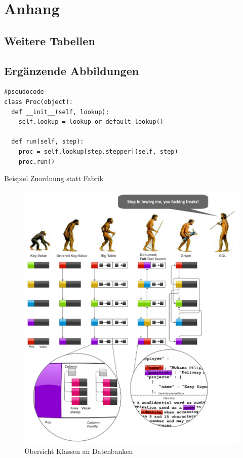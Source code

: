 \appendix
\chapter{Anhang}
\section{Weitere Tabellen}




\section{Ergänzende Abbildungen}

\begin{listing}[h]
\begin{verbatim}
#pseudocode
class Proc(object):
  def __init__(self, lookup):
    self.lookup = lookup or default_lookup()

  def run(self, step):
    proc = self.lookup[step.stepper](self, step)
    proc.run()
\end{verbatim}
\caption{Beispiel Zuordnung statt Fabrik}
\label{fig:fabrik-mapping}
\end{listing}


\begin{figure}
    \includegraphics[width=\textwidth]{images/databases-overview.png}
    \caption{Übersicht Klassen an Datenbanken}
    \label{fig:klassen-datenbanken}
\end{figure}
